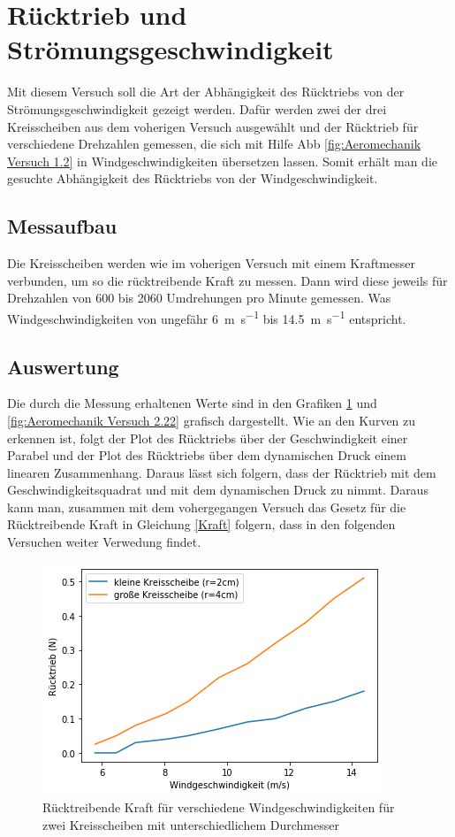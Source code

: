 \section{Rücktrieb und Strömungsgeschwindigkeit}

Mit diesem Versuch soll die Art der Abhängigkeit des Rücktriebs von der Strömungsgeschwindigkeit gezeigt werden. Dafür werden zwei der drei Kreisscheiben aus dem voherigen Versuch ausgewählt und der Rücktrieb für verschiedene Drehzahlen gemessen, die sich mit Hilfe Abb \ref{fig:Aeromechanik Versuch 1.2} in Windgeschwindigkeiten übersetzen lassen. Somit erhält man die gesuchte Abhängigkeit des Rücktriebs von der Windgeschwindigkeit.

\subsection{Messaufbau}

Die Kreisscheiben werden wie im voherigen Versuch mit einem Kraftmesser verbunden, um so die rücktreibende Kraft zu messen. Dann wird diese jeweils für Drehzahlen von 600 bis 2060 Umdrehungen pro Minute gemessen. Was Windgeschwindigkeiten von ungefähr \SI{6}{\metre\per\second} bis \SI{14.5}{\metre\per\second} entspricht.

\subsection{Auswertung}

Die durch die Messung erhaltenen Werte sind in den Grafiken  \ref{fig:Aeoreomechanik Versuch 2.21} und \ref{fig:Aeromechanik Versuch 2.22} grafisch dargestellt. Wie an den Kurven zu erkennen ist, folgt der Plot des Rücktriebs über der Geschwindigkeit einer Parabel und der Plot des Rücktriebs über dem dynamischen Druck einem linearen Zusammenhang. Daraus lässt sich folgern, dass der Rücktrieb mit dem Geschwindigkeitsquadrat und mit dem dynamischen Druck zu nimmt. Daraus kann man, zusammen mit dem vohergegangen Versuch das Gesetz für die Rücktreibende Kraft in Gleichung \ref{Kraft} folgern, dass in den folgenden Versuchen weiter Verwedung findet.

\begin{figure}[h!]
    \centering
    \includegraphics[scale=0.8]{Aeromechanik/Protokoll/fig/Aeromechanik Versuch 2.21.png}
    \caption{Rücktreibende Kraft für verschiedene Windgeschwindigkeiten für zwei Kreisscheiben mit unterschiedlichem Durchmesser}
    \label{fig:Aeoreomechanik Versuch 2.21}
\end{figure}

